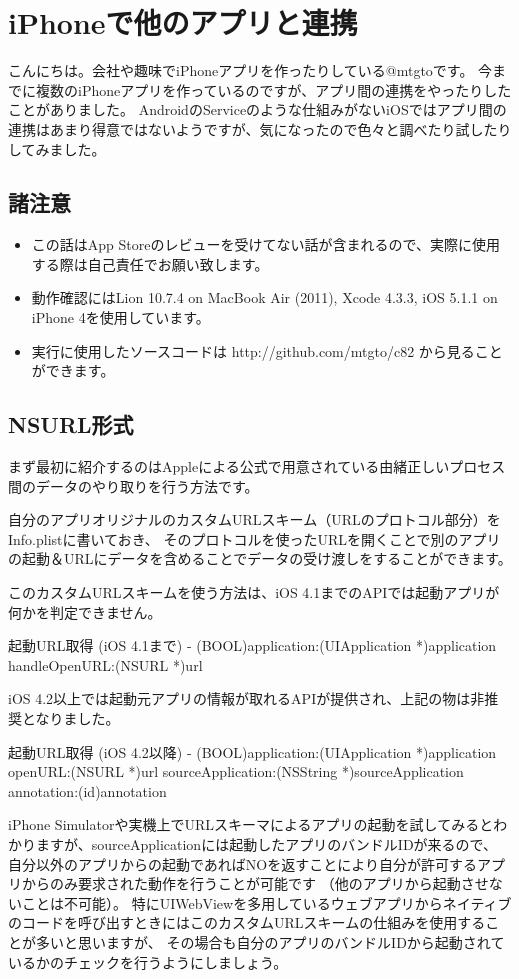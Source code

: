 \section{iPhoneで他のアプリと連携}
こんにちは。会社や趣味でiPhoneアプリを作ったりしている@mtgtoです。
今までに複数のiPhoneアプリを作っているのですが、アプリ間の連携をやったりしたことがありました。
AndroidのServiceのような仕組みがないiOSではアプリ間の連携はあまり得意ではないようですが、気になったので色々と調べたり試したりしてみました。

\subsection{諸注意}
\begin{itemize}
  \item この話はApp Storeのレビューを受けてない話が含まれるので、実際に使用する際は自己責任でお願い致します。
  \item 動作確認にはLion 10.7.4 on MacBook Air (2011), Xcode 4.3.3, iOS 5.1.1 on iPhone 4を使用しています。
  \item 実行に使用したソースコードは http://github.com/mtgto/c82 から見ることができます。
\end{itemize}
\subsection{NSURL形式}
まず最初に紹介するのはAppleによる公式で用意されている由緒正しいプロセス間のデータのやり取りを行う方法です。

自分のアプリオリジナルのカスタムURLスキーム（URLのプロトコル部分）をInfo.plistに書いておき、
そのプロトコルを使ったURLを開くことで別のアプリの起動＆URLにデータを含めることでデータの受け渡しをすることができます。

このカスタムURLスキームを使う方法は、iOS 4.1までのAPIでは起動アプリが何かを判定できません。
\begin{itembox}{起動URL取得 (iOS 4.1まで)}
- (BOOL)application:(UIApplication *)application handleOpenURL:(NSURL *)url
\end{itembox}
iOS 4.2以上では起動元アプリの情報が取れるAPIが提供され、上記の物は非推奨となりました。
\begin{itembox}{起動URL取得 (iOS 4.2以降)}
- (BOOL)application:(UIApplication *)application openURL:(NSURL *)url sourceApplication:(NSString *)sourceApplication annotation:(id)annotation
\end{itembox}
iPhone Simulatorや実機上でURLスキーマによるアプリの起動を試してみるとわかりますが、sourceApplicationには起動したアプリのバンドルIDが来るので、
自分以外のアプリからの起動であればNOを返すことにより自分が許可するアプリからのみ要求された動作を行うことが可能です
（他のアプリから起動させないことは不可能）。
特にUIWebViewを多用しているウェブアプリからネイティブのコードを呼び出すときにはこのカスタムURLスキームの仕組みを使用することが多いと思いますが、
その場合も自分のアプリのバンドルIDから起動されているかのチェックを行うようにしましょう。

